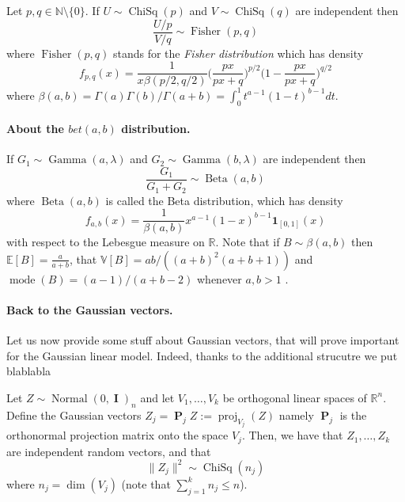 \documentclass[
	fontsize=11pt, %
	twoside=false, %
	numbers=noenddot, %
]{kaobook}
\DeclareMathOperator{\bI}{{\boldsymbol I}}
\DeclareMathOperator{\bP}{{\boldsymbol P}}
\DeclareMathOperator{\mode}{mode}
\DeclareMathOperator{\bet}{Beta}
\DeclareMathOperator{\chisq}{ChiSq}
\DeclareMathOperator{\fis}{Fisher}
\DeclareMathOperator{\gam}{Gamma}
\DeclareMathOperator{\nor}{Normal}
\DeclareMathOperator{\proj}{proj}
\newcommand{\E}{\mathbb E}
\newcommand{\R}{\mathbb R}
\newcommand{\N}{\mathbb N}
\newcommand{\var}{\mathbb V}
\newcommand{\ind}[1]{\mathbf 1_{#1}}
\newcommand{\norm}[1]{\|#1\|}
\begin{document}
Let $p, q \in \N \setminus \{ 0 \} $. If $U \sim \chisq(p)$ and $V \sim \chisq(q)$ are independent then
\begin{equation*}
	\frac{U / p}{V / q} \sim \fis(p, q)
\end{equation*}
where $\fis(p, q)$ stands for the \emph{Fisher distribution} which has density
\begin{equation*}
	f_{p, q}(x) = \frac{1}{x \beta(p/2, q/2)} \Big( \frac{px}{px + q} \Big)^{p/2} \Big(1 - \frac{px}{px + q} \Big)^{q/2}
\end{equation*}
where $\beta(a, b) = \Gamma(a) \Gamma(b) / \Gamma(a + b) = \int_0^1 t^{a-1} (1 - t)^{b - 1} dt$.

\paragraph{About the $bet(a, b)$ distribution.} %

If $G_1 \sim \gam(a, \lambda)$ and $G_2 \sim \gam(b, \lambda)$ are independent then
\begin{equation*}
	\frac{G_1}{G_1 + G_2} \sim \bet(a, b)
\end{equation*}
where $\bet(a, b)$ is called the Beta distribution, which has density
\begin{equation*}
	f_{a, b}(x) = \frac{1}{\beta(a, b)} x^{a - 1} (1 - x)^{b - 1} \ind{[0, 1]}(x)
\end{equation*}
with respect to the Lebesgue measure on $\R$. Note that if $B \sim \beta(a, b)$ then $\E[B] = \frac{a}{a + b}$, that $\var[B] = ab / ((a + b)^2 (a + b + 1))$ and $\mode(B) = (a - 1) / (a + b - 2)$ whenever $a, b > 1$ .


\paragraph{Back to the Gaussian vectors.}

Let us now provide some stuff about Gaussian vectors, that will prove important for the Gaussian linear model. Indeed, thanks to the additional strucutre we put blablabla

\begin{theorem}
	Let $Z \sim \nor(0, \bI)_n$ and let $V_1, \ldots, V_k$ be orthogonal linear spaces of $\R^n$. Define the Gaussian vectors $Z_j = \bP_j Z := \proj_{V_j}(Z)$ namely $\bP_j$ is the orthonormal projection matrix onto the space $V_j$. Then, we have that $Z_1, \ldots, Z_k$ are independent random vectors, and that
	\begin{equation}
		\norm{Z_j}^2 \sim \chisq(n_j)
	\end{equation}
	where $n_j = \dim(V_j)$ (note that $\sum_{j=1}^k n_j \leq n$).
\end{theorem}
\end{document}
